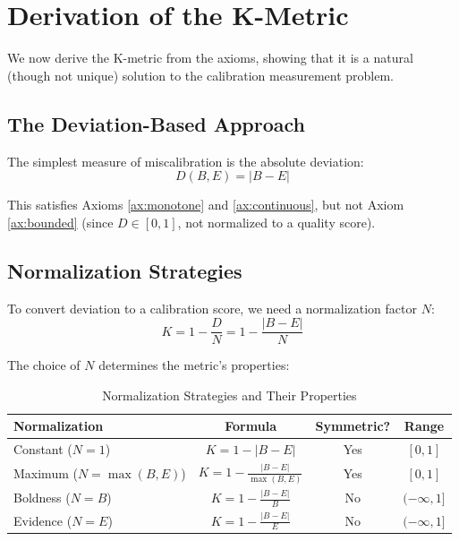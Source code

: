 \documentclass[11pt,a4paper]{article}
\theoremstyle{remark}
\begin{document}
\section{Derivation of the K-Metric}
\label{sec:derivation}

We now derive the K-metric from the axioms, showing that it is a natural (though not unique) solution to the calibration measurement problem.

\subsection{The Deviation-Based Approach}

The simplest measure of miscalibration is the absolute deviation:
\begin{equation}
D(B, E) = |B - E|
\end{equation}

This satisfies Axioms \ref{ax:monotone} and \ref{ax:continuous}, but not Axiom \ref{ax:bounded} (since $D \in [0,1]$, not normalized to a quality score).

\subsection{Normalization Strategies}

To convert deviation to a calibration score, we need a normalization factor $N$:
\begin{equation}
K = 1 - \frac{D}{N} = 1 - \frac{|B - E|}{N}
\end{equation}

The choice of $N$ determines the metric's properties:

\begin{table}[h]
\centering
\caption{Normalization Strategies and Their Properties}
\label{tab:normalization}
\begin{tabular}{lccc}
\toprule
\textbf{Normalization} & \textbf{Formula} & \textbf{Symmetric?} & \textbf{Range} \\
\midrule
Constant ($N = 1$) & $K = 1 - |B - E|$ & Yes & $[0, 1]$ \\
Maximum ($N = \max(B, E)$) & $K = 1 - \frac{|B - E|}{\max(B, E)}$ & Yes & $[0, 1]$ \\
Boldness ($N = B$) & $K = 1 - \frac{|B - E|}{B}$ & No & $(-\infty, 1]$ \\
Evidence ($N = E$) & $K = 1 - \frac{|B - E|}{E}$ & No & $(-\infty, 1]$ \\
\bottomrule
\end{tabular}
\end{table}
\end{document}
